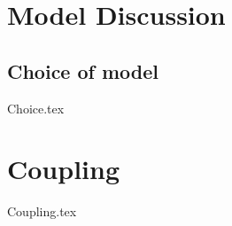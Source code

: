\chapter{Model Discussion}\label{ch:modelDis}

\newpage
\section{Choice of model}
{Choice.tex}

\newpage
\chapter{Coupling}
{Coupling.tex}
